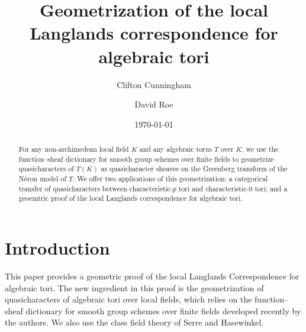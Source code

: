 \documentclass{amsart}
\title[Geometrization of the local Langlands correspondence for tori]{Geometrization of the local Langlands correspondence for algebraic tori}
\date{\today}
\author{Clifton Cunningham}
\author{David Roe}
\theoremstyle{plain}
\theoremstyle{definition}
\theoremstyle{remark}
\begin{document}
\begin{abstract}
For any non-archimedean local field $K$
  and any algebraic torus $T$ over $K$, we use the
  function--sheaf dictionary for smooth group schemes over finite fields
  to geometrize quasicharacters of $T(K)$
  as quasicharacter sheaves on the Greenberg transform of the Néron
  model of $T$.
 We offer two applications of this geometrization:
 a categorical transfer of quasicharacters between characteristic-$p$ tori and
 characteristic-$0$ tori; and a geoemtric proof of the local Langlands correspondence for algebraic tori.
  \end{abstract}

\maketitle

\section*{Introduction}



This paper provides a geometric proof of the local Langlands Correspondence for algebraic tori.
The new ingredient in this proof is the geometrization of quasicharacters of algebraic tori over local fields,
which relies on the function--sheaf dictionary for smooth group schemes over finite fields developed recently by the authors.
We also use the class field theory of Serre and Hasewinkel.
\end{document}
